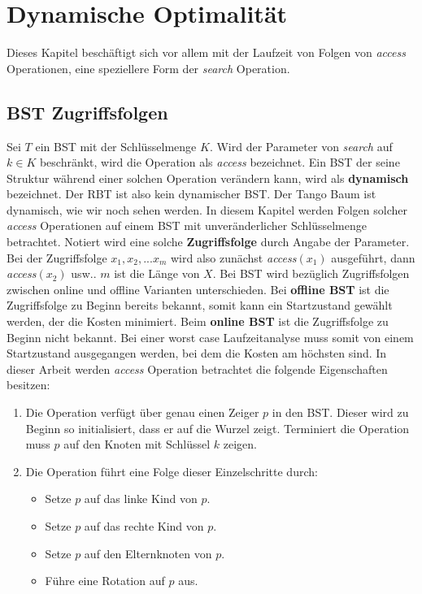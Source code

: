 \documentclass[a4paper,12pt]{article}
\begin{document}
\section{Dynamische Optimalität}
Dieses Kapitel beschäftigt sich vor allem mit der Laufzeit von Folgen von \textit{access} Operationen, eine speziellere Form der \textit{search} Operation.  
\subsection{BST Zugriffsfolgen}
Sei $T$ ein BST mit der Schlüsselmenge $K$. Wird der Parameter von \textit{search} auf $k \in K $ beschränkt, wird  die Operation als \textit{access} bezeichnet. Ein BST der seine Struktur während einer solchen Operation verändern kann, wird als \textbf{dynamisch} bezeichnet. Der RBT ist also kein dynamischer BST. Der Tango Baum ist dynamisch, wie wir noch sehen werden. In diesem Kapitel werden Folgen solcher \textit{access} Operationen auf einem BST mit unveränderlicher Schlüsselmenge betrachtet. Notiert wird eine solche \textbf{Zugriffsfolge} durch Angabe der Parameter. Bei der Zugriffsfolge $x_1,x_2,...x_m$ wird also zunächst \textit{access}$(x_1)$ ausgeführt, dann \textit{access}$(x_2)$ usw.. $m$ ist die Länge von $X$. Bei BST wird bezüglich Zugriffsfolgen zwischen online und offline Varianten unterschieden. Bei \textbf{offline BST} ist die Zugriffsfolge zu Beginn bereits bekannt, somit kann ein Startzustand gewählt werden, der die Kosten minimiert. Beim \textbf{online BST} ist die Zugriffsfolge zu Beginn nicht bekannt. Bei einer worst case Laufzeitanalyse muss somit von einem Startzustand ausgegangen werden, bei dem die Kosten am höchsten sind.
In dieser Arbeit werden \textit{access} Operation betrachtet die folgende Eigenschaften besitzen:

\begin{enumerate} 
	\item Die Operation verfügt über genau einen Zeiger $p$ in den BST. Dieser wird zu Beginn so initialisiert, dass er auf die Wurzel zeigt. Terminiert die Operation muss $p$ auf den Knoten mit Schlüssel $k$ zeigen.
	\item Die Operation führt eine Folge dieser Einzelschritte durch:
	\begin{itemize}
		\item Setze $p$ auf das linke Kind von $p$.
		\item Setze $p$ auf das rechte Kind von $p$.
		\item Setze $p$ auf den Elternknoten von $p$.
		\item Führe eine Rotation auf $p$ aus.
	\end{itemize}  
	
\end{enumerate}
\end{document}
